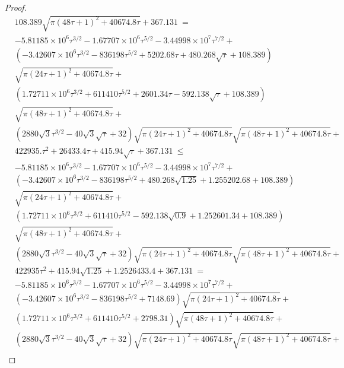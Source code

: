 \documentclass{article}
\renewcommand{\leq}{\leqslant}
\begin{document}
\begin{proof}
\begin{align}
&108.389 \sqrt{\pi  (48 \tau+1)^2+40674.8 \tau}+367.131\ = \\ \nonumber
&-5.81185\times 10^6 \tau^{3/2}-1.67707\times 10^6 \tau^{5/2}-3.44998\times 10^7 \tau^{7/2}+\\ \nonumber
&\left(-3.42607\times 10^6 \tau^{3/2}-836198 \tau^{5/2}+5202.68 \tau+480.268 \sqrt{\tau}+108.389\right) \\ \nonumber 
&\sqrt{\pi  (24 \tau+1)^2+40674.8 \tau}+\\ \nonumber 
&\left(1.72711\times 10^6 \tau^{3/2}+611410 \tau^{5/2}+2601.34 \tau-592.138 \sqrt{\tau}+108.389\right) \\ \nonumber 
&\sqrt{\pi  (48 \tau+1)^2+40674.8 \tau}+\\ \nonumber 
&\left(2880 \sqrt{3} \tau^{3/2}-40 \sqrt{3} \sqrt{\tau}+32\right) \sqrt{\pi  (24 \tau+1)^2+40674.8 \tau} \sqrt{\pi  (48 \tau+1)^2+40674.8 \tau}+\\ \nonumber 
&422935. \tau^2+26433.4 \tau+415.94 \sqrt{\tau}+367.131\ \leq \\ \nonumber &
-5.81185\times 10^6 \tau^{3/2}-1.67707\times 10^6 \tau^{5/2}-3.44998\times 10^7 \tau^{7/2}+\\ \nonumber 
&\left(-3.42607\times 10^6 \tau^{3/2}-836198 \tau^{5/2}+480.268 \sqrt{1.25}+1.25 5202.68+108.389\right) \\ \nonumber 
&\sqrt{\pi  (24 \tau+1)^2+40674.8 \tau}+\\ \nonumber 
&\left(1.72711\times 10^6 \tau^{3/2}+611410 \tau^{5/2}-592.138 \sqrt{0.9}+1.25 2601.34+108.389\right) \\ \nonumber 
&\sqrt{\pi  (48 \tau+1)^2+40674.8 \tau}+\\ \nonumber 
&\left(2880 \sqrt{3} \tau^{3/2}-40 \sqrt{3} \sqrt{\tau}+32\right) \sqrt{\pi  (24 \tau+1)^2+40674.8 \tau} \sqrt{\pi  (48 \tau+1)^2+40674.8 \tau}+\\ \nonumber 
&422935 \tau^2+415.94 \sqrt{1.25}+1.25 26433.4+367.131\ = \\ \nonumber &
-5.81185\times 10^6 \tau^{3/2}-1.67707\times 10^6 \tau^{5/2}-3.44998\times 10^7 \tau^{7/2}+\\ \nonumber 
&\left(-3.42607\times 10^6 \tau^{3/2}-836198 \tau^{5/2}+7148.69\right) \sqrt{\pi  (24 \tau+1)^2+40674.8 \tau}+\\ \nonumber 
&\left(1.72711\times 10^6 \tau^{3/2}+611410 \tau^{5/2}+2798.31\right) \sqrt{\pi  (48 \tau+1)^2+40674.8 \tau}+\\ \nonumber 
&\left(2880 \sqrt{3} \tau^{3/2}-40 \sqrt{3} \sqrt{\tau}+32\right) \sqrt{\pi  (24 \tau+1)^2+40674.8 \tau} \sqrt{\pi  (48 \tau+1)^2+40674.8 \tau}+\\ \nonumber 

\end{align}
\end{proof}
\end{document}
